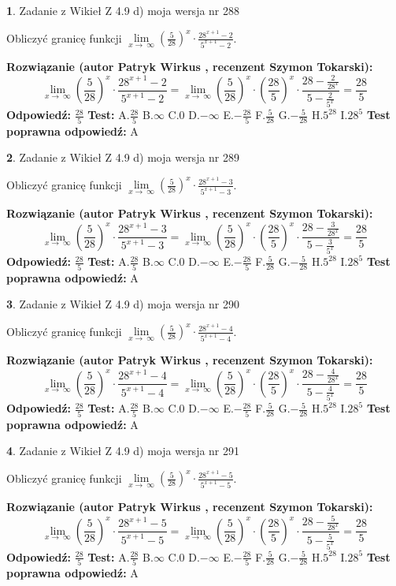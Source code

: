 \documentclass[12pt, a4paper]{article}
\theoremstyle{definition} %
\newtheorem{zad}{}
\newcommand{\zadStart}[1]{\begin{zad}#1\newline}
\newcommand{\zadStop}{\end{zad}}
\newcommand{\rozwStart}[2]{\noindent \textbf{Rozwiązanie (autor #1 , recenzent #2): }\newline}
\newcommand{\rozwStop}{\newline}
\newcommand{\odpStart}{\noindent \textbf{Odpowiedź:}\newline}
\newcommand{\odpStop}{\newline}
\newcommand{\testStart}{\noindent \textbf{Test:}\newline}
\newcommand{\testStop}{\newline}
\newcommand{\kluczStart}{\noindent \textbf{Test poprawna odpowiedź:}\newline}
\newcommand{\kluczStop}{\newline}
\begin{document}
\zadStart{Zadanie z Wikieł Z 4.9 d) moja wersja nr 288}


Obliczyć granicę funkcji  $\lim\limits_{x\to\ \infty}(\frac{5}{28})^{x}\cdot\frac{28^{x+1}-2}{5^{x+1}-2}$.
\zadStop
\rozwStart{Patryk Wirkus}{Szymon Tokarski}
$$\lim\limits_{x\to\ \infty}(\frac{5}{28})^{x}\cdot\frac{28^{x+1}-2}{5^{x+1}-2}=\lim\limits_{x\to\ \infty}(\frac{5}{28})^{x}\cdot(\frac{28}{5})^{x} \cdot \frac{28-\frac{2}{28^{x}}}{5-\frac{2}{5^{x}}} = \frac{28}{5}$$
\rozwStop
\odpStart
$\frac{28}{5}$
\odpStop
\testStart
A.$\frac{28}{5}$ B.$\infty$ C.$0$ D.$-\infty$ E.$-\frac{28}{5}$
F.$\frac{5}{28}$ G.$-\frac{5}{28}$
H.$5^{28}$
I.$28^{5}$
\testStop
\kluczStart
A
\kluczStop



\zadStart{Zadanie z Wikieł Z 4.9 d) moja wersja nr 289}


Obliczyć granicę funkcji  $\lim\limits_{x\to\ \infty}(\frac{5}{28})^{x}\cdot\frac{28^{x+1}-3}{5^{x+1}-3}$.
\zadStop
\rozwStart{Patryk Wirkus}{Szymon Tokarski}
$$\lim\limits_{x\to\ \infty}(\frac{5}{28})^{x}\cdot\frac{28^{x+1}-3}{5^{x+1}-3}=\lim\limits_{x\to\ \infty}(\frac{5}{28})^{x}\cdot(\frac{28}{5})^{x} \cdot \frac{28-\frac{3}{28^{x}}}{5-\frac{3}{5^{x}}} = \frac{28}{5}$$
\rozwStop
\odpStart
$\frac{28}{5}$
\odpStop
\testStart
A.$\frac{28}{5}$ B.$\infty$ C.$0$ D.$-\infty$ E.$-\frac{28}{5}$
F.$\frac{5}{28}$ G.$-\frac{5}{28}$
H.$5^{28}$
I.$28^{5}$
\testStop
\kluczStart
A
\kluczStop



\zadStart{Zadanie z Wikieł Z 4.9 d) moja wersja nr 290}


Obliczyć granicę funkcji  $\lim\limits_{x\to\ \infty}(\frac{5}{28})^{x}\cdot\frac{28^{x+1}-4}{5^{x+1}-4}$.
\zadStop
\rozwStart{Patryk Wirkus}{Szymon Tokarski}
$$\lim\limits_{x\to\ \infty}(\frac{5}{28})^{x}\cdot\frac{28^{x+1}-4}{5^{x+1}-4}=\lim\limits_{x\to\ \infty}(\frac{5}{28})^{x}\cdot(\frac{28}{5})^{x} \cdot \frac{28-\frac{4}{28^{x}}}{5-\frac{4}{5^{x}}} = \frac{28}{5}$$
\rozwStop
\odpStart
$\frac{28}{5}$
\odpStop
\testStart
A.$\frac{28}{5}$ B.$\infty$ C.$0$ D.$-\infty$ E.$-\frac{28}{5}$
F.$\frac{5}{28}$ G.$-\frac{5}{28}$
H.$5^{28}$
I.$28^{5}$
\testStop
\kluczStart
A
\kluczStop



\zadStart{Zadanie z Wikieł Z 4.9 d) moja wersja nr 291}


Obliczyć granicę funkcji  $\lim\limits_{x\to\ \infty}(\frac{5}{28})^{x}\cdot\frac{28^{x+1}-5}{5^{x+1}-5}$.
\zadStop
\rozwStart{Patryk Wirkus}{Szymon Tokarski}
$$\lim\limits_{x\to\ \infty}(\frac{5}{28})^{x}\cdot\frac{28^{x+1}-5}{5^{x+1}-5}=\lim\limits_{x\to\ \infty}(\frac{5}{28})^{x}\cdot(\frac{28}{5})^{x} \cdot \frac{28-\frac{5}{28^{x}}}{5-\frac{5}{5^{x}}} = \frac{28}{5}$$
\rozwStop
\odpStart
$\frac{28}{5}$
\odpStop
\testStart
A.$\frac{28}{5}$ B.$\infty$ C.$0$ D.$-\infty$ E.$-\frac{28}{5}$
F.$\frac{5}{28}$ G.$-\frac{5}{28}$
H.$5^{28}$
I.$28^{5}$
\testStop
\kluczStart
A
\kluczStop
\end{document}
